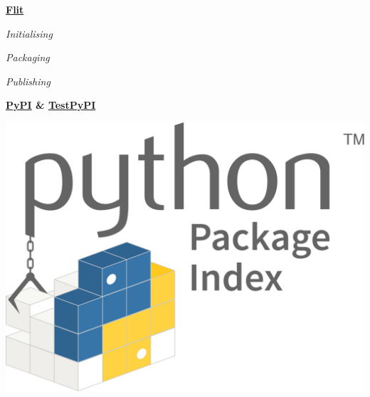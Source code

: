 \begin{frame}
    \centering
    
    \begin{multicols}{2}
        {\Large \textbf{\href{https://flit.readthedocs.io/en/latest/upload.html\#using-pypirc}{Flit}}}
    
        \vspace{0.8cm}
        \textit{Initialising}

        \vspace{0.5cm}
        \textit{Packaging}

        \vspace{0.5cm}
        \textit{Publishing}

        \columnbreak
        \pause        
        {\Large \textbf{\href{https://pypi.org/}{PyPI} \& \href{https://test.pypi.org/}{TestPyPI}}}

        \vspace{0.5cm}

        \includegraphics[scale=0.1]{Bin/pypi_logo.png}
    \end{multicols}

\end{frame}
